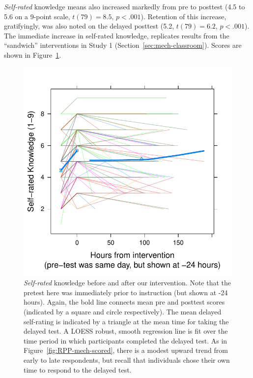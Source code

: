 \emph{Self-rated} knowledge means also increased markedly from pre to posttest (4.5
to 5.6 on a 9-point scale, $t(79)=8.5$, $p<.001$). Retention of this increase,
gratifyingly, was also noted on the delayed posttest (5.2, $t(79)=6.2$,
$p<.001$). The immediate increase in self-rated knowledge, replicates
results from the ``sandwich'' interventions in Study 1
(Section~\ref{sec:mech-classroom}). Scores are shown in
Figure~\ref{fig:RPP-mech-self}.

\begin{figure}
    \centering
    \includegraphics{RPP-mech-self.pdf}
    \caption{\emph{Self-rated} knowledge before and after our intervention. Note
        that the pretest here was immediately prior to instruction (but shown at
        -24 hours). Again, the bold line connects mean pre and posttest scores
        (indicated by a square and circle respectively). The mean delayed
        self-rating is indicated by a triangle at the mean time for taking the
        delayed test. A LOESS robust, smooth regression line is fit over the
        time period in which participants completed the delayed test.  As in
        Figure~\ref{fig:RPP-mech-scored}, there is a modest upward trend from
        early to late respondents, but recall that individuals chose their own
        time to respond to the delayed test.}
    \label{fig:RPP-mech-self}
\end{figure}

